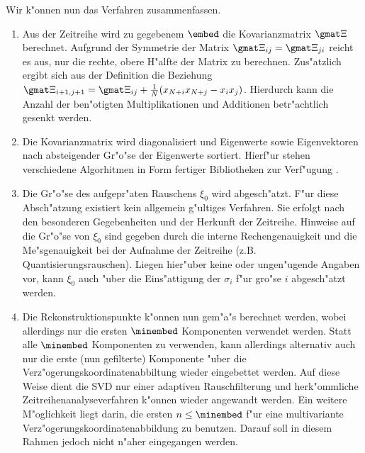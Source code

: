 Wir k"onnen nun das Verfahren zusammenfassen.
\begin{enumerate}
\item Aus der Zeitreihe wird zu gegebenem $\embed$ die Kovarianzmatrix $\gmat \Xi$
berechnet.
Aufgrund der Symmetrie der Matrix $\gmat \Xi_{ij}=\gmat \Xi_{ji}$ reicht es aus, nur die
rechte, obere H"alfte der Matrix zu berechnen. Zus"atzlich ergibt sich aus der Definition
 die Beziehung
$\gmat\Xi_{i+1,j+1}=\gmat\Xi_{ij}+\frac{1}{N}(x_{N+i}x_{N+j}-x_ix_j)$. Hierdurch kann die Anzahl der
ben"otigten Multiplikationen und Additionen betr"achtlich gesenkt werden.
\item Die Kovarianzmatrix wird diagonalisiert und Eigenwerte sowie Eigenvektoren nach
absteigender Gr"o"se der Eigenwerte sortiert. 
Hierf"ur stehen verschiedene Algorhitmen in Form fertiger Bibliotheken zur Verf"ugung
\cite{numerical-recipes}. 
\item Die Gr"o"se des aufgepr"aten Rauschens $\xi_0$ wird abgesch"atzt. 
F"ur diese Absch"atzung existiert kein allgemein g"ultiges Verfahren.
Sie erfolgt nach den besonderen Gegebenheiten und der Herkunft der
Zeitreihe. 
Hinweise auf die Gr"o"se von $\xi_0$ sind gegeben durch die interne Rechengenauigkeit und die 
Me"sgenauigkeit bei der Aufnahme der Zeitreihe (z.B. Quantisierungsrauschen).
Liegen hier"uber keine oder ungen"ugende Angaben vor, kann $\xi_0$ auch "uber die
Eins"attigung der $\sigma_i$ f"ur gro"se $i$ abgesch"atzt werden.
\item Die Rekonstruktionspunkte k"onnen nun gem"a"s  berechnet werden,
wobei allerdings nur die ersten $\minembed$ Komponenten verwendet werden. 
Statt alle $\minembed$ Komponenten zu verwenden, kann allerdings alternativ auch nur die
erste (nun gefilterte) Komponente "uber die Verz"ogerungskoordinatenabbiltung wieder
eingebettet werden. 
Auf diese Weise dient die SVD nur einer adaptiven Rauschfilterung und herk"ommliche
Zeitreihenanalyseverfahren k"onnen wieder angewandt werden.
Ein weitere M"oglichkeit liegt darin, die ersten $n\leq\minembed$ f"ur eine multivariante
Verz"ogerungskoordinatenabbildung zu benutzen.
Darauf soll in diesem Rahmen jedoch nicht n"aher eingegangen werden.
\end{enumerate}

